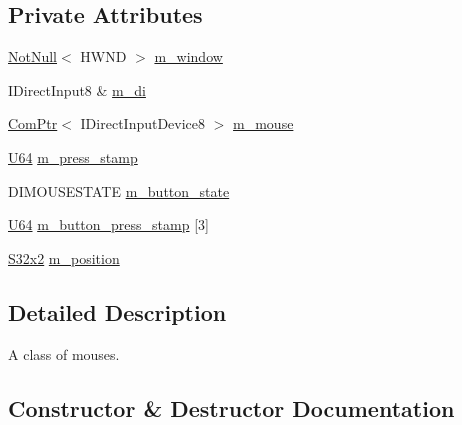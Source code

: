 \subsection*{Private Attributes}
\begin{DoxyCompactItemize}
\item 
\hyperlink{namespacemage_a8769f9d670d6b585ea306cb1062af94b}{Not\+Null}$<$ H\+W\+ND $>$ \hyperlink{classmage_1_1input_1_1_mouse_1_1_impl_af478d106ce9e9e12ac32717c5523c7f5}{m\+\_\+window}
\item 
I\+Direct\+Input8 \& \hyperlink{classmage_1_1input_1_1_mouse_1_1_impl_af356557a537747ee5c852dba02795931}{m\+\_\+di}
\item 
\hyperlink{namespacemage_ae74f374780900893caa5555d1031fd79}{Com\+Ptr}$<$ I\+Direct\+Input\+Device8 $>$ \hyperlink{classmage_1_1input_1_1_mouse_1_1_impl_a1c5de7f34edab12846e75cf7d2b76094}{m\+\_\+mouse}
\item 
\hyperlink{namespacemage_a6672cf3c861707ce4a3235a3eb43941d}{U64} \hyperlink{classmage_1_1input_1_1_mouse_1_1_impl_a18304bef70290efaec61ad9eca140ce8}{m\+\_\+press\+\_\+stamp}
\item 
D\+I\+M\+O\+U\+S\+E\+S\+T\+A\+TE \hyperlink{classmage_1_1input_1_1_mouse_1_1_impl_a2ef89cc9d05fde7a7145c774380878cb}{m\+\_\+button\+\_\+state}
\item 
\hyperlink{namespacemage_a6672cf3c861707ce4a3235a3eb43941d}{U64} \hyperlink{classmage_1_1input_1_1_mouse_1_1_impl_af3ea37adb563ff1c353d8358a6a74818}{m\+\_\+button\+\_\+press\+\_\+stamp} \mbox{[}3\mbox{]}
\item 
\hyperlink{namespacemage_a02de5a44f35ee9917e5788d63795fece}{S32x2} \hyperlink{classmage_1_1input_1_1_mouse_1_1_impl_aaf430602e56efbeeae8d46012be4437e}{m\+\_\+position}
\end{DoxyCompactItemize}


\subsection{Detailed Description}
A class of mouses. 

\subsection{Constructor \& Destructor Documentation}
\hypertarget{classmage_1_1input_1_1_mouse_1_1_impl_a123b86c874208b15d61eae54a2633a68}{}\label{classmage_1_1input_1_1_mouse_1_1_impl_a123b86c874208b15d61eae54a2633a68} 
